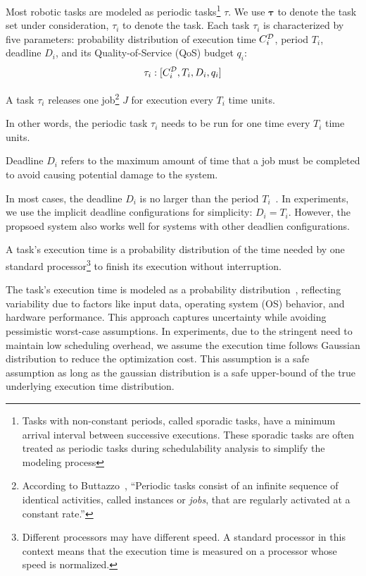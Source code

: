 	Most robotic tasks are modeled as periodic tasks\footnote{Tasks with non-constant periods, called sporadic tasks, have a minimum arrival interval between successive executions. These sporadic tasks are often treated as periodic tasks during schedulability analysis to simplify the modeling process} $\tau$.
    We use $\boldsymbol{\tau}$ to denote the task set under consideration, $\tau_i$ to denote the  task.
    Each task $\tau_i$ is characterized by five parameters: probability distribution of execution time $C_{i}^{\mathcal{D}}$, period $T_i$, deadline $D_i$, and its Quality-of-Service (QoS) budget $q_i$:
	\begin{equation}
		\tau_i: [C_{i}^{\mathcal{D}}, T_i, D_i, q_i]
		\label{eq_notation_task}
	\end{equation}


	\begin{definition}[Period, $T_i$]
		A task $\tau_i$ releases one job\footnote{According to Buttazzo~\cite{Buttazzo2011HardRC}, ``Periodic tasks consist of an infinite sequence of identical activities, called instances or \textit{jobs}, that are regularly activated at a constant rate.''} $J$ for execution every $T_i$ time units.
	\end{definition}
    In other words, the periodic task $\tau_i$ needs to be run for one time every $T_i$ time units.

	\begin{definition}[Deadline, $D_i$]
		Deadline $D_i$ refers to the maximum amount of time that a job must be completed to avoid causing potential damage to the system.
	\end{definition}

    In most cases, the deadline $D_i$ is no larger than the period $T_i$~\cite{Buttazzo2011HardRC, Wang2023RTAS}.
	In experiments, we use the implicit deadline configurations for simplicity: $D_i = T_i$.
	However, the propsoed system also works well for systems with other deadlien configurations.


	\begin{definition}
		A task's execution time is a probability distribution of the time needed by one standard processor\footnote{Different processors may have different speed.
		A standard processor in this context means that the execution time is measured on a processor whose speed is normalized.} to finish its execution without interruption.
	\end{definition}

    The task's execution time is modeled as a probability distribution~\cite{Maxim2013ResponseTA}, reflecting variability due to factors like input data, operating system (OS) behavior, and hardware performance.
    This approach captures uncertainty while avoiding pessimistic worst-case assumptions.
	In experiments, due to the stringent need to maintain low scheduling overhead, we assume the execution time follows Gaussian distribution to reduce the optimization cost.
	This assumption is a safe assumption as long as the gaussian distribution is a safe upper-bound of the true underlying execution time distribution.


